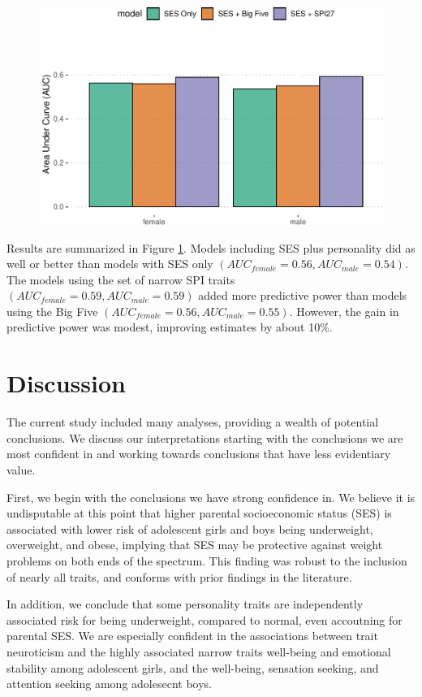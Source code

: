 \documentclass[man]{apa6}
\begin{document}
\begin{figure}
\includegraphics[width=5in]{bmi_personality_files/figure-latex/auc-1} \caption{ }\label{fig:auc}
\end{figure}

Results are summarized in Figure \ref{fig:auc}. Models including SES plus personality did as well or better than models with SES only \((AUC_{female} = 0.56, AUC_{male} = 0.54)\). The models using the set of narrow SPI traits \((AUC_{female} = 0.59, AUC_{male} = 0.59)\) added more predictive power than models using the Big Five \((AUC_{female} = 0.56, AUC_{male} = 0.55)\). However, the gain in predictive power was modest, improving estimates by about 10\%.

\hypertarget{discussion}{%
\section{Discussion}\label{discussion}}

The current study included many analyses, providing a wealth of potential conclusions. We discuss our interpretations starting with the conclusions we are most confident in and working towards conclusions that have less evidentiary value.

First, we begin with the conclusions we have strong confidence in. We believe it is undisputable at this point that higher parental socioeconomic status (SES) is associated with lower risk of adolescent girls and boys being underweight, overweight, and obese, implying that SES may be protective against weight problems on both ends of the spectrum. This finding was robust to the inclusion of nearly all traits, and conforms with prior findings in the literature.

In addition, we conclude that some personality traits are independently associated risk for being underweight, compared to normal, even accoutning for parental SES. We are especially confident in the associations between trait neuroticism and the highly associated narrow traits well-being and emotional stability among adolescent girls, and the well-being, sensation seeking, and attention seeking among adolesecnt boys.
\end{document}

